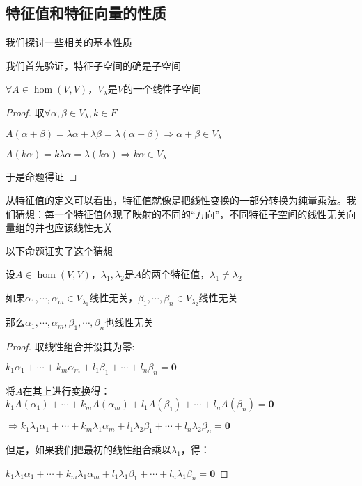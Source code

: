 \documentclass[12pt, a4paper, oneside, UTF8]{ctexbook}
\begin{document}
		\subsection{特征值和特征向量的性质}
			我们探讨一些相关的基本性质
			\begin{para}{0}
				\point{}

					我们首先验证，特征子空间的确是子空间
					\begin{proposition}
						$\forall A \in \hom(V,V)$，$V_\lambda $是$V$的一个线性子空间
					\end{proposition}
					\begin{proof}
						取$\forall \alpha ,\beta \in V_\lambda ,k \in F$

						$A(\alpha +\beta )=\lambda \alpha +\lambda \beta =\lambda (\alpha +\beta ) \Rightarrow \alpha +\beta \in V_\lambda $

						$A(k\alpha )=k\lambda \alpha =\lambda (k\alpha )\Rightarrow k\alpha \in V_\lambda $

						于是命题得证
					\end{proof}
				\point{}
					
					从特征值的定义可以看出，特征值就像是把线性变换的一部分转换为纯量乘法。我们猜想：每一个特征值体现了映射的不同的“方向”，不同特征子空间的线性无关向量组的并也应该线性无关

					以下命题证实了这个猜想
					\begin{proposition}
						设$A \in \hom(V,V)$，$\lambda_1,\lambda_2$是$A$的两个特征值，$\lambda_1\neq \lambda_2$

						如果$\alpha_1,\cdots,\alpha_m \in V_{\lambda_1}$线性无关，$\beta_1,\cdots,\beta_n \in V_{\lambda_2}$线性无关

						那么$\alpha_1,\cdots,\alpha_m,\beta_1,\cdots,\beta_n$也线性无关
					\end{proposition}
					\begin{proof}
						取线性组合并设其为零:

						$k_1\alpha_1+\cdots+k_m\alpha_m+l_1\beta_1+\cdots+l_n\beta_n=\mathbf{0}$

						将$A$在其上进行变换得：$k_1A(\alpha_1)+\cdots+k_mA(\alpha_m)+l_1A(\beta_1)+\cdots+l_nA(\beta_n)=\mathbf{0}$

						$\Rightarrow k_1\lambda_1\alpha_1 +\cdots+k_m\lambda_1\alpha_m+l_1\lambda_2\beta_1+\cdots+l_n\lambda_2\beta_n=\mathbf{0}$

						但是，如果我们把最初的线性组合乘以$\lambda_1$，得：

						$k_1\lambda_1\alpha_1 +\cdots+k_m\lambda_1\alpha_m+l_1\lambda_1\beta_1+\cdots+l_n\lambda_1\beta_n=\mathbf{0}$


\end{proof}
\end{para}
\end{document}
